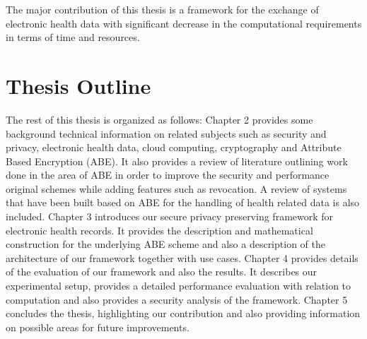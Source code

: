 The major contribution of this thesis is a framework for the exchange of electronic health data with significant decrease in the computational requirements in terms of time and resources.

\section{Thesis Outline}

The rest of this thesis is organized as follows: Chapter 2 provides some background technical information on related subjects such as security and privacy, electronic health data, cloud computing, cryptography and Attribute Based Encryption (ABE). It also provides a review of literature outlining work done in the area of ABE in order to improve the security and performance original schemes while adding features such as revocation. A review of systems that have been built based on ABE for the handling of health related data is also included. Chapter 3 introduces our secure privacy preserving framework for electronic health records. It provides the description and mathematical construction for the underlying ABE scheme and also a description of the architecture of our framework together with use cases. Chapter 4 provides details of the evaluation of our framework and also the results. It describes our experimental setup, provides a detailed performance evaluation with relation to computation and also provides a security analysis of the framework. Chapter 5 concludes the thesis, highlighting our contribution and also providing information on possible areas for future improvements.